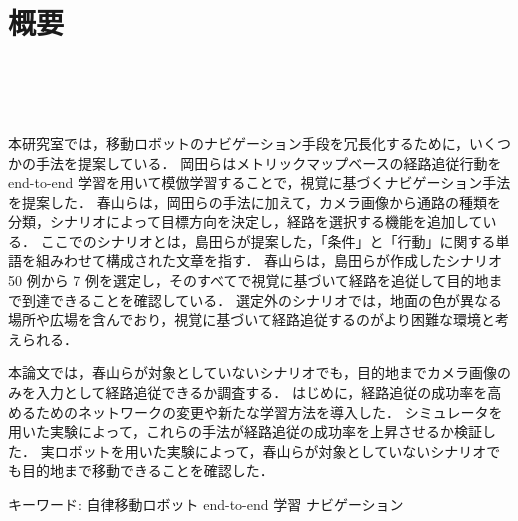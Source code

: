 \chapter*{概要}
\thispagestyle{empty}
%
\begin{center}
  \scalebox{1.0}{視覚と行動のend-to-end学習により}\\
  \vspace{-1.0zh}
  \scalebox{1.0}{経路追従行動を模倣する手法の提案}\\
  \scalebox{1.0}{-経路選択の成功率向上を意図したネットワークの変更と実験的評価-}\\
\end{center}
\vspace{1.0zh}

本研究室では，移動ロボットのナビゲーション手段を冗長化するために，いくつかの手法を提案している．
岡田らはメトリックマップベースの経路追従行動を end-to-end 学習を用いて模倣学習することで，視覚に基づくナビゲーション手法を提案した．
春山らは，岡田らの手法に加えて，カメラ画像から通路の種類を分類，シナリオによって目標方向を決定し，経路を選択する機能を追加している．
ここでのシナリオとは，島田らが提案した，「条件」と「行動」に関する単語を組みわせて構成された文章を指す．
春山らは，島田らが作成したシナリオ 50 例から 7 例を選定し，そのすべてで視覚に基づいて経路を追従して目的地まで到達できることを確認している．
選定外のシナリオでは，地面の色が異なる場所や広場を含んでおり，視覚に基づいて経路追従するのがより困難な環境と考えられる．

本論文では，春山らが対象としていないシナリオでも，目的地までカメラ画像のみを入力として経路追従できるか調査する．
はじめに，経路追従の成功率を高めるためのネットワークの変更や新たな学習方法を導入した．
シミュレータを用いた実験によって，これらの手法が経路追従の成功率を上昇させるか検証した．
実ロボットを用いた実験によって，春山らが対象としていないシナリオでも目的地まで移動できることを確認した．

キーワード: 自律移動ロボット end-to-end 学習 ナビゲーション
%
\newpage
